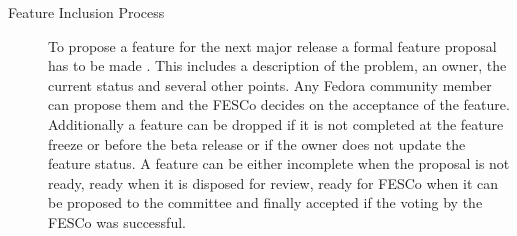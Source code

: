 \begin{description}
\begin{description}
    \item[Feature Inclusion Process] To propose a feature for the next major
      release a formal feature proposal has to be made
      \cite{FedoraFeatures,FedoraFESCo}. This includes a description of the
      problem, an owner, the current status and several other points. Any
      Fedora community member can propose them and the \ac{FESCo} decides on
      the acceptance of the feature. Additionally a feature can be dropped if
      it is not completed at the feature freeze or before the beta release or
      if the owner does not update the feature status. A feature can be either
      incomplete when the proposal is not ready, ready when it is disposed for
      review, ready for \ac{FESCo} when it can be proposed to the committee and
      finally accepted if the voting by the \ac{FESCo} was successful.

  \end{description}

\end{description}


